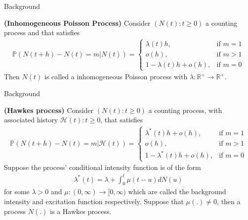 \documentclass[11pt]{beamer}
\theoremstyle{example}
\begin{document}
\begin{frame}{Background}
\begin{definition}
	\textbf{(Inhomogeneous Poisson Process)} Consider $(N(t):t \geq 0)$ a counting process and that satisfies
	\begin{align*}
	\mathbb{P}(N(t+h)-N(t)=m|N(t))=
	\begin{cases}
	\lambda(t)h,& \text{if } m=1\\
	o(h) ,& \text{if } m>1\\
	1-\lambda(t)h+o(h),& \text{if } m=0
	\end{cases}
	\end{align*}
	Then $N(t)$ is called a inhomogeneous Poisson process with $\lambda:\mathbb{R}^+ \rightarrow \mathbb{R}^+$.
\end{definition}
\end{frame}
\begin{frame}{Background}
\begin{definition}
	\textbf{(Hawkes process)} Consider $(N(t):t \geq 0)$ a counting process, with associated history $\mathcal{H}(t):t \geq 0$, that satisfies
	\begin{align*}
	\mathbb{P}(N(t+h)-N(t)=m|\mathcal{H}(t))=
	\begin{cases}
	\lambda^*(t)h+o(h),& \text{if } m=1\\
	o(h) ,& \text{if } m>1\\
	1-\lambda^*(t)h+o(h),& \text{if } m=0
	\end{cases}
	\end{align*}
	Suppose the process' conditional intensity function is of the form
	\begin{align*}
	\lambda^*(t)=\lambda+\int_{0}^{t}\mu(t-u)dN(u)
	\end{align*}
	for some $\lambda>0$ and $\mu:(0,\infty) \rightarrow [0,\infty)$ which are called the background intensity and excitation function respectively. Suppose that $\mu(.) \neq 0$, then a process $N(.)$ is a Hawkes process.
\end{definition}
\end{frame}
\end{document}
